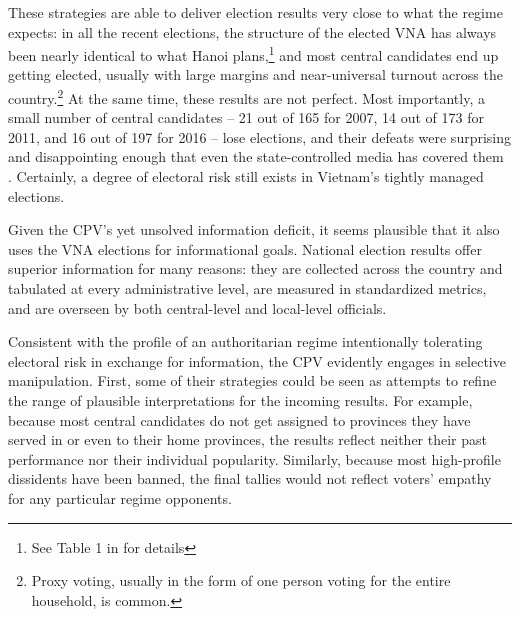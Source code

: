\documentclass[12pt]{article}
\newcommand\fnote[1]{\footnote{\baselineskip=2\normalbaselineskip#1}}
\newcommand{\1}{\mathbbm{1}}
\begin{document}
These strategies are able to deliver election results very close to what the regime expects: in all the recent elections, the structure of the elected VNA has always been nearly identical to what Hanoi plans,\fnote{See Table 1 in \citet[][506]{MaleskySchuler2011} for details} and most central candidates end up getting elected, usually with large margins and near-universal turnout across the country.\fnote{Proxy voting, usually in the form of one person voting for the entire household, is common.} At the same time, these results are not perfect. Most importantly, a small number of central candidates -- 21 out of 165 for 2007, 14 out of 173 for 2011, and 16 out of 197 for 2016 -- lose elections, and their defeats were surprising and disappointing enough that even the state-controlled media has covered them \citep[e.g.][]{vov2016}. Certainly, a degree of electoral risk still exists in Vietnam's tightly managed elections.

Given the CPV's yet unsolved information deficit, it seems plausible that it also uses the VNA elections for informational goals. National election results offer superior information for many reasons: they are collected across the country and tabulated at every administrative level, are measured in standardized metrics, and are overseen by both central-level and local-level officials.

Consistent with the profile of an authoritarian regime intentionally tolerating electoral risk in exchange for information, the CPV evidently engages in selective manipulation. First, some of their strategies could be seen as attempts to refine the range of plausible interpretations for the incoming results. For example, because most central candidates do not get assigned to provinces they have served in or even to their home provinces, the results reflect neither their past performance nor their individual popularity. Similarly, because most high-profile dissidents have been banned, the final tallies would not reflect voters' empathy for any particular regime opponents.
\end{document}
